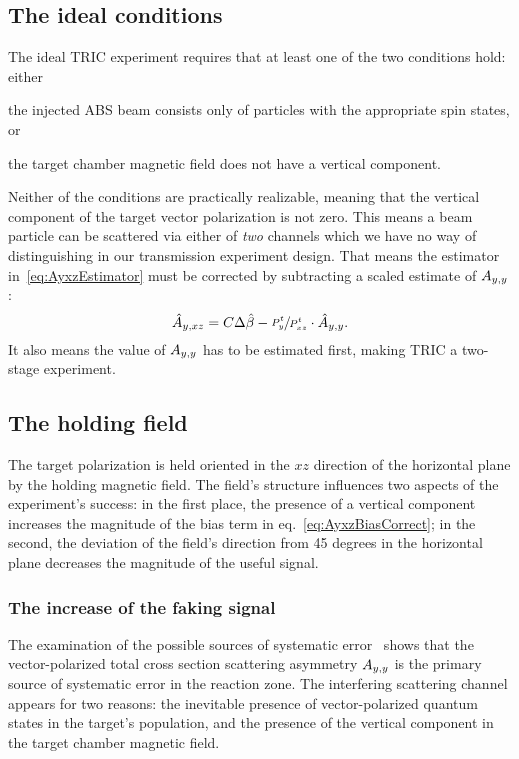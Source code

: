 \documentclass{article}
\begin{document}

\subsection{The ideal conditions}
The ideal TRIC experiment requires that at least one of the two conditions hold: either
\begin{inparaenum}[1)]
	\item the injected ABS beam consists only of particles with the appropriate spin states, or
	\item the target chamber magnetic field does not have a vertical component.
\end{inparaenum}

Neither of the conditions are practically realizable, meaning that the vertical component of the target vector polarization is not zero. This means a beam particle can be scattered via either of \emph{two} channels which we have no way of distinguishing in our transmission experiment design. That means the estimator in~\eqref{eq:AyxzEstimator} must be corrected by subtracting a scaled estimate of $\Ayy$: 
\begin{equation}\label{eq:AyxzBiasCorrect}
\Ayxz* = C\Delta\slp* - \sfrac{P^t_y}{P^t_{xz}}\cdot\Ayy*.
\end{equation}
It also means the value of $\Ayy$ has to be estimated first, making TRIC a two-stage experiment.


\subsection{The holding field}

The target polarization is held oriented in the $xz$ direction of the horizontal plane by the holding magnetic field. The field's structure influences two aspects of the experiment's success: in the first place, the presence of a vertical component increases the magnitude of the bias term in eq.~\eqref{eq:AyxzBiasCorrect}; in the second, the deviation of the field's direction from 45 degrees in the horizontal plane decreases the magnitude of the useful signal.

\subsubsection{The increase of the faking signal}
The examination of the possible sources of systematic error~\cite{Proposal} shows that the vector-polarized total cross section scattering asymmetry $\Ayy$ is the primary source of systematic error in the reaction zone. The interfering scattering channel appears for two reasons: the inevitable presence of vector-polarized quantum states in the target's population, and the presence of the vertical component in the target chamber magnetic field. 
\end{document}
